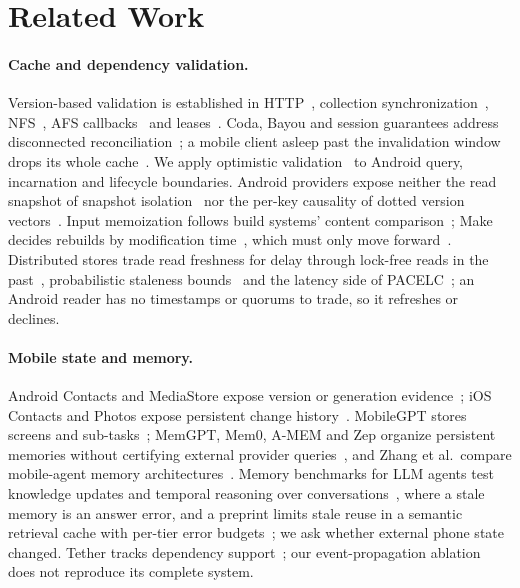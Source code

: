 \section{Related Work}
\label{sec:related}
\paragraph{Cache and dependency validation.} Version-based validation is established in HTTP~\cite{rfc9110}, collection synchronization~\cite{rfc6578}, NFS~\cite{rfc7530}, AFS callbacks~\cite{howard1988afs} and leases~\cite{gray1989leases,burrows2006chubby}. Coda, Bayou and session guarantees address disconnected reconciliation~\cite{kistler1992coda,terry1995bayou,terry1994session}; a mobile client asleep past the invalidation window drops its whole cache~\cite{barbara1994sleepers}. We apply optimistic validation~\cite{kung1981occ} to Android query, incarnation and lifecycle boundaries. Android providers expose neither the read snapshot of snapshot isolation~\cite{berenson1995critique,fekete2005making} nor the per-key causality of dotted version vectors~\cite{preguica2010dvv}. Input memoization follows build systems' content comparison~\cite{mokhov2018build}; Make decides rebuilds by modification time~\cite{feldman1979make}, which must only move forward~\cite{mokhov2018build}. Distributed stores trade read freshness for delay through lock-free reads in the past~\cite{corbett2012spanner}, probabilistic staleness bounds~\cite{bailis2012pbs} and the latency side of PACELC~\cite{abadi2012pacelc}; an Android reader has no timestamps or quorums to trade, so it refreshes or declines.

\paragraph{Mobile state and memory.} Android Contacts and Media\-Store expose version or generation evidence~\cite{android_syncadapter,android_mediastore}; iOS Contacts and Photos expose persistent change history~\cite{apple_cnchangehistory,apple_phpersistent}. MobileGPT stores screens and sub-tasks~\cite{lee2024mobilegpt}; MemGPT, Mem0, A-MEM and Zep organize persistent memories without certifying external provider queries~\cite{packer2023memgpt,chhikara2025mem0,xu2025amem,rasmussen2025zep}, and Zhang et al.\ compare mobile-agent memory architectures~\cite{zhang2026mobilememory}. Memory benchmarks for LLM agents test knowledge updates and temporal reasoning over conversations~\cite{wu2025longmemeval,maharana2024locomo}, where a stale memory is an answer error, and a preprint limits stale reuse in a semantic retrieval cache with per-tier error budgets~\cite{mansoor2026freshcache}; we ask whether external phone state changed. Tether tracks dependency support~\cite{wang2026tether}; our event-propagation ablation does not reproduce its complete system.

